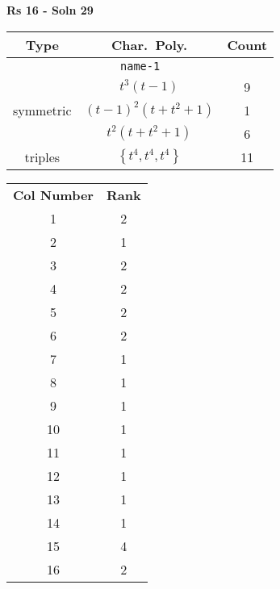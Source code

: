 \documentclass{article}
\begin{document}
    \textbf{Rs 16 - Soln 29}
    \begin{table}
    \begin{tabular}{|c|c|c|}
    \hline
    \textbf{Type} & \textbf{Char.~Poly.} & \textbf{Count} \\
    \hline \multicolumn{3}{|c|}{\texttt{name-1}} \\ \hline
    \multirow{3}{*}{symmetric}
    & $t^3(t - 1)$ & 9 \\
    & $(t - 1)^2(t + t^2 + 1)$ & 1 \\
    & $t^2(t + t^2 + 1)$ & 6 \\
    \hline
    \multirow{1}{*}{triples}
    & $\left\{t^4,t^4,t^4\right\}$ & 11 \\
    \hline
    \end{tabular}
    \end{table}
    \begin{table}
    \begin{tabular}{|c|c|}
    \hline
    \textbf{Col Number} & \textbf{Rank}\\
    1 & 2 \\ 
    2 & 1 \\ 
    3 & 2 \\ 
    4 & 2 \\ 
    5 & 2 \\ 
    6 & 2 \\ 
    7 & 1 \\ 
    8 & 1 \\ 
    9 & 1 \\ 
    10 & 1 \\ 
    11 & 1 \\ 
    12 & 1 \\ 
    13 & 1 \\ 
    14 & 1 \\ 
    15 & 4 \\ 
    16 & 2 \\ 
    \hline
    \end{tabular}
    \end{table}
    \newpage
\end{document}
